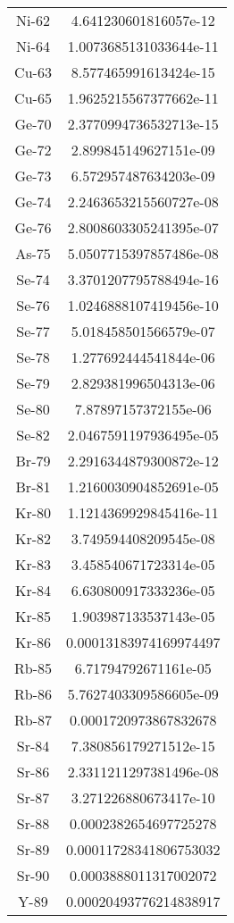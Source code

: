 \begin{table}[h!]
\begin{tabular}{|| c || c |}
Ni-62 &  4.641230601816057e-12 \\
Ni-64 &  1.0073685131033644e-11 \\
Cu-63 &  8.577465991613424e-15 \\
Cu-65 &  1.9625215567377662e-11 \\
Ge-70 &  2.3770994736532713e-15 \\
Ge-72 &  2.899845149627151e-09 \\
Ge-73 &  6.572957487634203e-09 \\
Ge-74 &  2.2463653215560727e-08 \\
Ge-76 &  2.8008603305241395e-07 \\
As-75 &  5.0507715397857486e-08 \\
Se-74 &  3.3701207795788494e-16 \\
Se-76 &  1.0246888107419456e-10 \\
Se-77 &  5.018458501566579e-07 \\
Se-78 &  1.277692444541844e-06 \\
Se-79 &  2.829381996504313e-06 \\
Se-80 &  7.87897157372155e-06 \\
Se-82 &  2.0467591197936495e-05 \\
Br-79 &  2.2916344879300872e-12 \\
Br-81 &  1.2160030904852691e-05 \\
Kr-80 &  1.1214369929845416e-11 \\
Kr-82 &  3.749594408209545e-08 \\
Kr-83 &  3.458540671723314e-05 \\
Kr-84 &  6.630800917333236e-05 \\
Kr-85 &  1.903987133537143e-05 \\
Kr-86 &  0.00013183974169974497 \\
Rb-85 &  6.71794792671161e-05 \\
Rb-86 &  5.7627403309586605e-09 \\
Rb-87 &  0.0001720973867832678 \\
Sr-84 &  7.380856179271512e-15 \\
Sr-86 &  2.3311211297381496e-08 \\
Sr-87 &  3.271226880673417e-10 \\
Sr-88 &  0.0002382654697725278 \\
Sr-89 &  0.00011728341806753032 \\
Sr-90 &  0.0003888011317002072 \\
Y-89 &  0.00020493776214838917 \\

\end{tabular}
\end{table}
